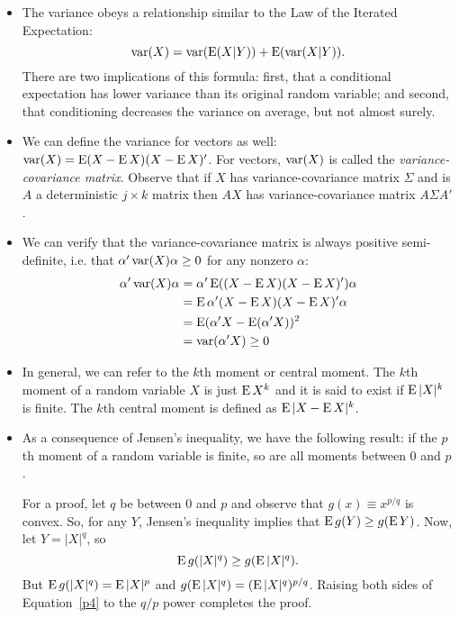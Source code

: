 \begin{itemize}
\item The variance obeys a relationship similar to the Law of the
  Iterated Expectation:
  \begin{equation*}
    \operatorname{var}(X) = \operatorname{var}(\operatorname{E}(X|Y)) + \operatorname{E}(\operatorname{var}(X|Y)).
  \end{equation*}
  There are two implications of this formula: first, that a
  conditional expectation has lower variance than its original random
  variable; and second, that conditioning decreases the variance on
  average, but not almost surely.

\item We can define the variance for vectors as well: $\operatorname{var}(X) = \operatorname{E}(X
  - \operatorname{E} X) (X - \operatorname{E} X)'$.  For vectors, $\operatorname{var}(X)$ is called the
  \emph{variance-covariance matrix}.  Observe that if $X$ has
  variance-covariance matrix $\Sigma$ and is $A$ a deterministic $j \times k$
  matrix then $A X$ has variance-covariance matrix $A \Sigma A'$.

\item We can verify that the variance-covariance matrix is always
  positive semi-definite, i.e. that $\alpha'\operatorname{var}(X)\alpha \geq 0$ for any nonzero
  $\alpha$:
  \begin{align*}
    \alpha'\operatorname{var}(X)\alpha &= \alpha' \operatorname{E}((X - \operatorname{E} X)(X - \operatorname{E} X)') \alpha \\
    &= \operatorname{E} \alpha'(X - \operatorname{E} X)(X - \operatorname{E} X)'\alpha \\
    &= \operatorname{E} (\alpha'X - \operatorname{E}(\alpha'X))^2 \\
    &= \operatorname{var}(\alpha'X) \geq 0
  \end{align*}

\item In general, we can refer to the $k$th moment or central moment.
  The $k$th moment of a random variable $X$ is just $\operatorname{E} X^k$ and it is
  said to exist if $\operatorname{E} |X|^k$ is finite.  The $k$th central moment is
  defined as $\operatorname{E} |X - \operatorname{E} X|^k$.

\item As a consequence of Jensen's inequality, we have the following
  result: if the $p$th moment of a random variable is finite, so are
  all moments between 0 and $p$.

  For a proof, let $q$ be between 0 and $p$ and observe that $g(x) \equiv
  x^{p/q}$ is convex.  So, for any $Y$, Jensen's inequality implies
  that $\operatorname{E} g(Y) \geq g(\operatorname{E} Y)$.  Now, let $Y = |X|^q$, so
  \begin{equation}\label{p4}
    \E g(|X|^q) \geq g(\E |X|^q).
  \end{equation}
  But $\operatorname{E} g(|X|^q) = \operatorname{E} |X|^p$ and $g(\operatorname{E} |X|^q) = (\operatorname{E} |X|^q)^{p/q}$.
  Raising both sides of Equation~\eqref{p4} to the $q/p$ power
  completes the proof.


\end{itemize}
